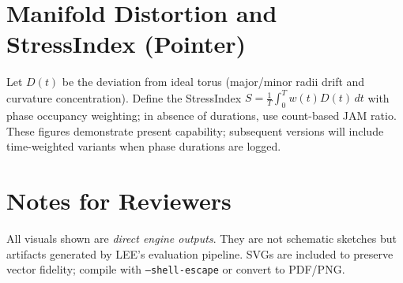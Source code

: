 \documentclass[12pt]{article}
\begin{document}
\section{Manifold Distortion and StressIndex (Pointer)}
Let $D(t)$ be the deviation from ideal torus (major/minor radii drift and curvature concentration). 
Define the StressIndex $S=\frac{1}{T}\int_0^T w(t)D(t)\,dt$ with phase occupancy weighting; in absence of durations, use count-based JAM ratio. 
These figures demonstrate present capability; subsequent versions will include time-weighted variants when phase durations are logged.

\section{Notes for Reviewers}
All visuals shown are \emph{direct engine outputs}. They are not schematic sketches but artifacts generated by LEE’s evaluation pipeline.
SVGs are included to preserve vector fidelity; compile with \texttt{--shell-escape} or convert to PDF/PNG.



\end{document}
